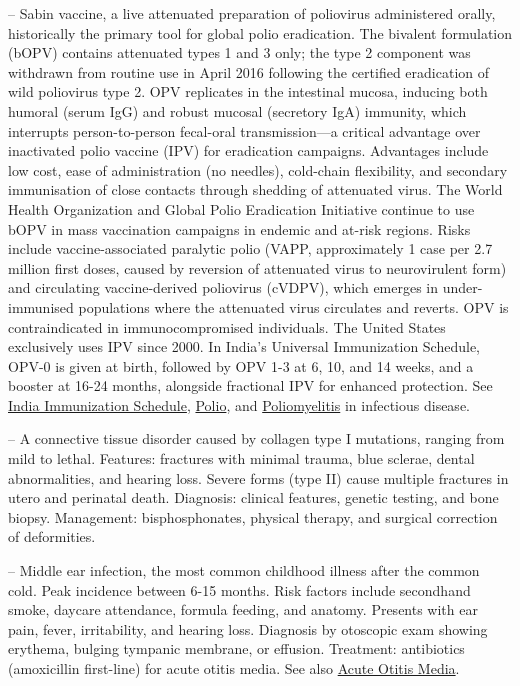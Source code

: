 -- Sabin vaccine, a live attenuated preparation of poliovirus administered orally, historically the primary tool for global polio eradication. The bivalent formulation (bOPV) contains attenuated types 1 and 3 only; the type 2 component was withdrawn from routine use in April 2016 following the certified eradication of wild poliovirus type 2. OPV replicates in the intestinal mucosa, inducing both humoral (serum IgG) and robust mucosal (secretory IgA) immunity, which interrupts person-to-person fecal-oral transmission---a critical advantage over inactivated polio vaccine (IPV) for eradication campaigns. Advantages include low cost, ease of administration (no needles), cold-chain flexibility, and secondary immunisation of close contacts through shedding of attenuated virus. The World Health Organization and Global Polio Eradication Initiative continue to use bOPV in mass vaccination campaigns in endemic and at-risk regions. Risks include vaccine-associated paralytic polio (VAPP, approximately 1 case per 2.7 million first doses, caused by reversion of attenuated virus to neurovirulent form) and circulating vaccine-derived poliovirus (cVDPV), which emerges in under-immunised populations where the attenuated virus circulates and reverts. OPV is contraindicated in immunocompromised individuals. The United States exclusively uses IPV since 2000. In India's Universal Immunization Schedule, OPV-0 is given at birth, followed by OPV 1-3 at 6, 10, and 14 weeks, and a booster at 16-24 months, alongside fractional IPV for enhanced protection. See \hyperlink{India Immunization Schedule}{India Immunization Schedule}, \hyperlink{Polio}{Polio}, and \hyperlink{Poliomyelitis}{Poliomyelitis} in infectious disease.

-- A connective tissue disorder caused by collagen type I mutations, ranging from mild to lethal. Features: fractures with minimal trauma, blue sclerae, dental abnormalities, and hearing loss. Severe forms (type II) cause multiple fractures in utero and perinatal death. Diagnosis: clinical features, genetic testing, and bone biopsy. Management: bisphosphonates, physical therapy, and surgical correction of deformities.

-- Middle ear infection, the most common childhood illness after the common cold. Peak incidence between 6-15 months. Risk factors include secondhand smoke, daycare attendance, formula feeding, and anatomy. Presents with ear pain, fever, irritability, and hearing loss. Diagnosis by otoscopic exam showing erythema, bulging tympanic membrane, or effusion. Treatment: antibiotics (amoxicillin first-line) for acute otitis media. See also \hyperlink{Acute Otitis Media}{Acute Otitis Media}.

